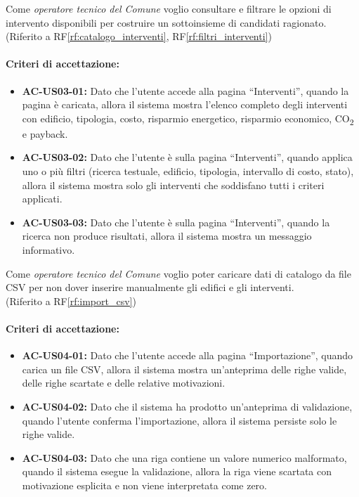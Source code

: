  \label{us:interventi}
Come \textit{operatore tecnico del Comune} voglio consultare e filtrare le opzioni di intervento disponibili per costruire un sottoinsieme di candidati ragionato. \\ (Riferito a RF\ref{rf:catalogo_interventi}, RF\ref{rf:filtri_interventi})

\paragraph{Criteri di accettazione:}
\begin{itemize}
    \item \textbf{AC-US03-01:} Dato che l'utente accede alla pagina ``Interventi'', quando la pagina è caricata, allora il sistema mostra l'elenco completo degli interventi con edificio, tipologia, costo, risparmio energetico, risparmio economico, CO\textsubscript{2} e payback.
    \item \textbf{AC-US03-02:} Dato che l'utente è sulla pagina ``Interventi'', quando applica uno o più filtri (ricerca testuale, edificio, tipologia, intervallo di costo, stato), allora il sistema mostra solo gli interventi che soddisfano tutti i criteri applicati.
    \item \textbf{AC-US03-03:} Dato che l'utente è sulla pagina ``Interventi'', quando la ricerca non produce risultati, allora il sistema mostra un messaggio informativo.
\end{itemize}

 \label{us:import}
Come \textit{operatore tecnico del Comune} voglio poter caricare dati di catalogo da file CSV per non dover inserire manualmente gli edifici e gli interventi. \\ (Riferito a RF\ref{rf:import_csv})

\paragraph{Criteri di accettazione:}
\begin{itemize}
    \item \textbf{AC-US04-01:} Dato che l'utente accede alla pagina ``Importazione'', quando carica un file CSV, allora il sistema mostra un'anteprima delle righe valide, delle righe scartate e delle relative motivazioni.
    \item \textbf{AC-US04-02:} Dato che il sistema ha prodotto un'anteprima di validazione, quando l'utente conferma l'importazione, allora il sistema persiste solo le righe valide.
    \item \textbf{AC-US04-03:} Dato che una riga contiene un valore numerico malformato, quando il sistema esegue la validazione, allora la riga viene scartata con motivazione esplicita e non viene interpretata come zero.
\end{itemize}


